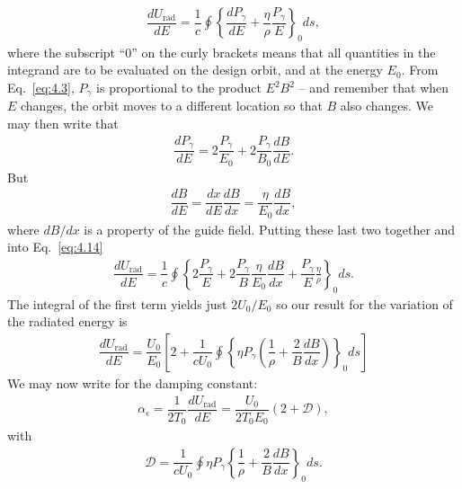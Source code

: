 \documentclass[../sands-adaptation.tex]{subfiles}
\begin{document}
\begin{align} \label{eq:4.14}
	\dfrac{dU_\text{rad}}{dE} = \dfrac{1}{c} \oint \left\lbrace \dfrac{dP_\gamma}{dE} + \dfrac{\eta}{\rho} \dfrac{P_\gamma}{E} \right\rbrace_0 ds,
\end{align}
where the subscript ``0'' on the curly brackets means that all quantities in the integrand are to be evaluated on the design orbit, and at the energy $E_0$. From Eq.~\eqref{eq:4.3}, $P_\gamma$ is proportional to the product $E^2 B^2$ -- and remember that when $E$ changes, the orbit moves to a different location so that $B$ also changes. We may then write that
\begin{align*}
	\dfrac{dP_\gamma}{dE} = 2 \dfrac{P_\gamma}{E_0} + 2 \dfrac{P_\gamma}{B_0} \dfrac{dB}{dE}.
\end{align*}
But
\begin{align*}
	\dfrac{dB}{dE} = \dfrac{dx}{dE} \dfrac{dB}{dx} = \dfrac{\eta}{E_0} \dfrac{dB}{dx},
\end{align*}
where $dB/dx$ is a property of the guide field. Putting these last two together and into Eq.~\eqref{eq:4.14}
\begin{align*}
	\dfrac{dU_\text{rad}}{dE} = \dfrac{1}{c} \oint \left\lbrace 2 \dfrac{P_\gamma}{E} + 2 \dfrac{P_\gamma}{B} \dfrac{\eta}{E_0} \dfrac{dB}{dx} + \dfrac{P_\gamma}{E} \frac{\eta}{\rho}  \right\rbrace_0 ds.
\end{align*}
The integral
 of the first
 term yields just $2U_0/E_0$ so our result for the variation of the radiated energy is
\begin{align}
	\dfrac{dU_\text{rad}}{dE} = \dfrac{U_0}{E_0} \left[ 2 + \dfrac{1}{cU_0} \oint \left\lbrace \eta P_\gamma \left( \dfrac{1}{\rho} + \dfrac{2}{B} \dfrac{dB}{dx} \right) \right\rbrace_0 ds \right]
\end{align}
We may now write for the damping constant:
\begin{align}\label{eq:4.16}
\alpha_\epsilon = \dfrac{1}{2 T_0} \dfrac{dU_\text{rad}}{dE} = \dfrac{U_0}{2 T_0 E_0} (2 + \mathscr{D}),
\end{align}
with
\begin{align}
	\mathscr{D} = \dfrac{1}{c U_0} \oint \eta P_\gamma \left\lbrace \dfrac{1}{\rho} + \dfrac{2}{B} \dfrac{dB}{dx} \right\rbrace_0 ds.
\end{align}
\end{document}
